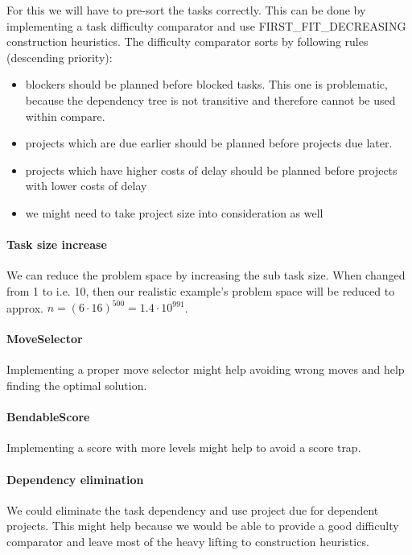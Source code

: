 \documentclass[10pt,a4paper]{article}
\begin{document}
For this we will have to pre-sort the tasks correctly. This can be done by implementing a task difficulty comparator and use FIRST\_FIT\_DECREASING construction heuristics. The difficulty comparator sorts by following rules (descending priority):

\begin{itemize}
\item blockers should be planned before blocked tasks. This one is problematic, because the dependency tree is not transitive and therefore cannot be used within compare.
\item projects which are due earlier should be planned before projects due later.
\item projects which have higher costs of delay should be planned before projects with lower costs of delay
\item we might need to take project size into consideration as well
\end{itemize}

\paragraph{Task size increase}

We can reduce the problem space by increasing the sub task size. When changed from 1 to i.e. 10, then our realistic example's problem space will be reduced to approx. $n = (6 \cdot 16) ^{500} = 1.4 \cdot 10^{991}$.

\paragraph{MoveSelector}

Implementing a proper move selector might help avoiding wrong moves and help finding the optimal solution.

\paragraph{BendableScore}

Implementing a score with more levels might help to avoid a score trap.

\paragraph{Dependency elimination}

We could eliminate the task dependency and use project due for dependent projects. This might help because we would be able to provide a good difficulty comparator and leave most of the heavy lifting to construction heuristics.
\end{document}
